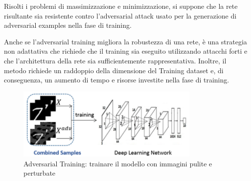         Risolti i problemi di massimizzazione e minimizzazione, si suppone che la rete risultante sia resistente contro l'adversarial attack usato per la generazione di adversarial examples nella fase di training.
        
        Anche se l'adversarial training migliora la robustezza di una rete, è una strategia non adattativa che richiede che il training sia eseguito utilizzando attacchi forti e che l'architettura della rete sia sufficientemente rappresentativa.
        Inoltre, il metodo richiede un raddoppio della dimensione del Training dataset e, di conseguenza, un aumento di tempo e risorse investite nella fase di training.
            \begin{figure}[!h]
                \centering
                \includegraphics[width=0.8\textwidth]{Images/Mitigation/Adversarial training.png}
                \caption{Adversarial Training: trainare il modello con immagini pulite e perturbate}
                \label{Adversarial Training}
            \end{figure}
    \newpage
    
